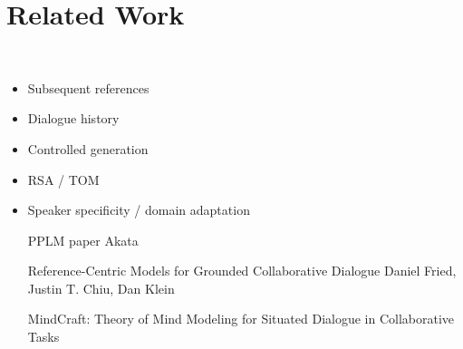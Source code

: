 
\section{Related Work}
\label{sec:related-work}

\\

\begin{itemize}
\item Subsequent references \cite{gupta2005automatic,jordan2005learning,stoia-etal-2006-noun,viethen-etal-2011-generating}
\item Dialogue history \cite{brockmann2005modelling,buschmeier-etal-2009-alignment,stoyanchev-stent-2009-lexical,lopes2015rule,hu2016entrainment,dusek-jurcicek-2016-context}
\item Controlled generation \cite{nguyen2017plug,dathathri2020plug,keskar2019ctrl,ziegler2019finetuning}
\item RSA / TOM \cite{premack1978tom,corona2019modeling,andreas-klein-2016-reasoning,vedantam2017context,cohn-gordon-etal-2018-pragmatically}
\item Speaker specificity / domain adaptation

PPLM paper
Akata

Reference-Centric Models for Grounded Collaborative Dialogue
Daniel Fried, Justin T. Chiu, Dan Klein

MindCraft: Theory of Mind Modeling for Situated Dialogue in Collaborative Tasks

\end{itemize}


